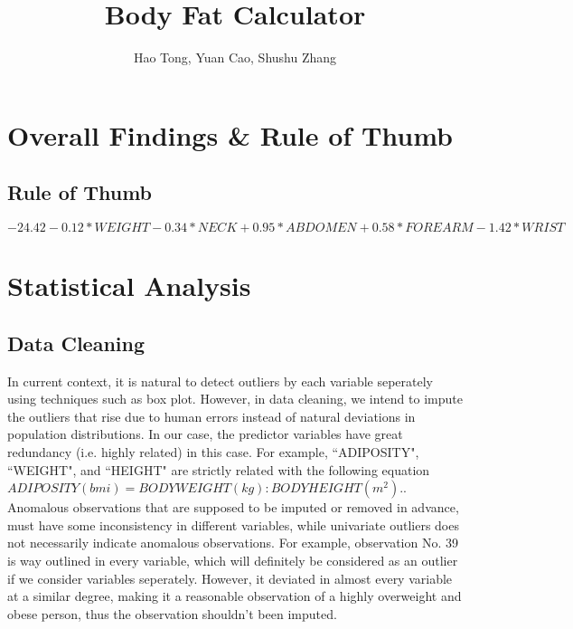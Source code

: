 \documentclass[]{article}
\title{Body Fat Calculator}
\author{Hao Tong, Yuan Cao, Shushu Zhang}
\begin{document}
\maketitle

\section{Overall Findings \& Rule of Thumb}
\subsection{Rule of Thumb}
$$-24.42-0.12*WEIGHT-0.34*NECK+0.95*ABDOMEN+0.58*FOREARM-1.42*WRIST$$

\section{Statistical Analysis}
\subsection{Data Cleaning}
In current context, it is natural to detect outliers by each variable seperately using techniques such as box plot. However, in data cleaning, we intend to impute the outliers that rise due to human errors instead of natural deviations in population distributions. In our case, the predictor variables have great redundancy (i.e. highly related) in this case. For example, ``ADIPOSITY", ``WEIGHT", and ``HEIGHT" are strictly related with the following equation $ADIPOSITY(bmi) = BODY WEIGHT(kg) : BODY HEIGHT(m^2).$. Anomalous observations that are supposed to be imputed or removed in advance, must have some inconsistency in different variables, while univariate outliers does not necessarily indicate anomalous observations. For example, observation No. 39 is way outlined in every variable, which will definitely be considered as an outlier if we consider variables seperately. However, it deviated in almost every variable at a similar degree, making it a reasonable observation of a highly overweight and obese person, thus the observation shouldn't been imputed. 
\end{document}
